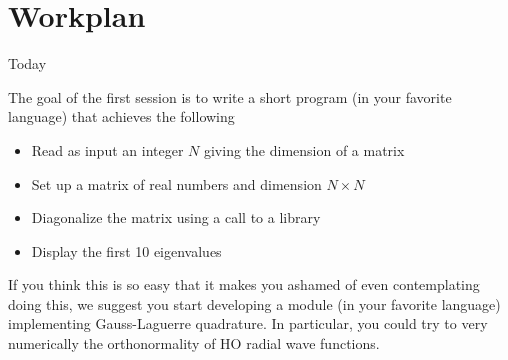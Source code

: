 \documentclass[mode=present,paper=screen,size=12pt,style=paintings]{powerdot}
\begin{document}


\section{Workplan}


\begin{slide}{Today}

The goal of the first session is to write a short program (in your favorite language) that achieves the following
\begin{itemize}
\item Read as input an integer $N$ giving the dimension of a matrix
\item Set up a matrix of real numbers and dimension $N\times N$
\item Diagonalize the matrix using a call to a library
\item Display the first 10 eigenvalues
\end{itemize}

If you think this is so easy that it makes you ashamed of even contemplating doing this, we suggest you start developing a module (in your favorite language) implementing Gauss-Laguerre quadrature. In particular, you could try to very numerically the orthonormality of HO radial wave functions.

\end{slide}
\end{document}
